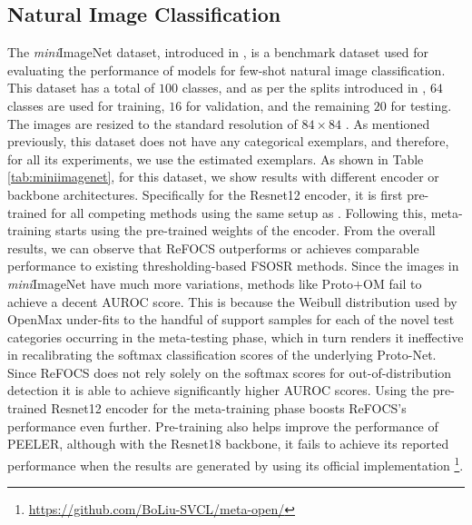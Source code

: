 \subsection{Natural Image Classification}
The \textit{mini}ImageNet dataset, introduced in \cite{match_net}, is a benchmark dataset used for evaluating the performance of models for few-shot natural image classification. This dataset has a total of $100$ classes, and as per the splits introduced in \cite{match_net}, $64$ classes are used for training, $16$ for validation, and the remaining $20$ for testing. The images are resized to the standard resolution of $84 \times 84$ \cite{match_net}. As mentioned previously, this dataset does not have any categorical exemplars, and therefore, for all its experiments, we use the estimated exemplars. As shown in Table \ref{tab:miniimagenet}, for this dataset, we show results with different encoder or backbone architectures. Specifically for the Resnet12 encoder, it is first pre-trained for all competing methods using the same setup as \cite{snatcher}. Following this, meta-training starts using the pre-trained weights of the encoder. From the overall results, we can observe that ReFOCS outperforms or achieves comparable performance to existing thresholding-based FSOSR methods. Since the images in \textit{mini}ImageNet have much more variations, methods like Proto$+$OM fail to achieve a decent AUROC score. This is because the Weibull distribution used by OpenMax \cite{open_max} under-fits to the handful of support samples for each of the novel test categories occurring in the meta-testing phase, which in turn renders it ineffective in recalibrating the softmax classification scores of the underlying Proto-Net. Since ReFOCS does not rely solely on the softmax scores for out-of-distribution detection it is able to achieve significantly higher AUROC scores. Using the pre-trained Resnet12 encoder for the meta-training phase boosts ReFOCS's performance even further. Pre-training also helps improve the performance of PEELER, although with the Resnet18 backbone, it fails to achieve its reported performance when the results are generated by using its official implementation  \footnote{\label{url}\url{https://github.com/BoLiu-SVCL/meta-open/}}.

